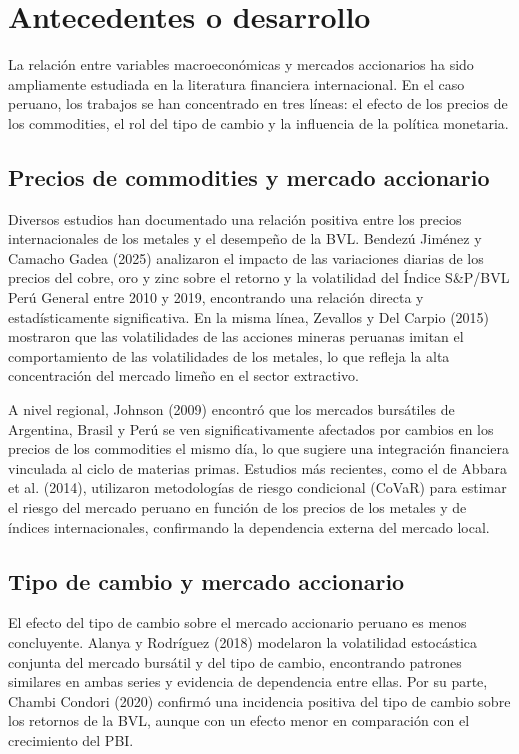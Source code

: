 \documentclass[12pt, a4paper]{article}
\begin{document}
\section{Antecedentes o desarrollo}

La relación entre variables macroeconómicas y mercados accionarios ha sido ampliamente estudiada en la literatura financiera internacional. En el caso peruano, los trabajos se han concentrado en tres líneas: el efecto de los precios de los commodities, el rol del tipo de cambio y la influencia de la política monetaria.

\subsection{Precios de commodities y mercado accionario}

Diversos estudios han documentado una relación positiva entre los precios internacionales de los metales y el desempeño de la BVL. Bendezú Jiménez y Camacho Gadea (2025) analizaron el impacto de las variaciones diarias de los precios del cobre, oro y zinc sobre el retorno y la volatilidad del Índice S\&P/BVL Perú General entre 2010 y 2019, encontrando una relación directa y estadísticamente significativa. En la misma línea, Zevallos y Del Carpio (2015) mostraron que las volatilidades de las acciones mineras peruanas imitan el comportamiento de las volatilidades de los metales, lo que refleja la alta concentración del mercado limeño en el sector extractivo.

A nivel regional, Johnson (2009) encontró que los mercados bursátiles de Argentina, Brasil y Perú se ven significativamente afectados por cambios en los precios de los commodities el mismo día, lo que sugiere una integración financiera vinculada al ciclo de materias primas. Estudios más recientes, como el de Abbara et al. (2014), utilizaron metodologías de riesgo condicional (CoVaR) para estimar el riesgo del mercado peruano en función de los precios de los metales y de índices internacionales, confirmando la dependencia externa del mercado local.

\subsection{Tipo de cambio y mercado accionario}

El efecto del tipo de cambio sobre el mercado accionario peruano es menos concluyente. Alanya y Rodríguez (2018) modelaron la volatilidad estocástica conjunta del mercado bursátil y del tipo de cambio, encontrando patrones similares en ambas series y evidencia de dependencia entre ellas. Por su parte, Chambi Condori (2020) confirmó una incidencia positiva del tipo de cambio sobre los retornos de la BVL, aunque con un efecto menor en comparación con el crecimiento del PBI.
\end{document}
